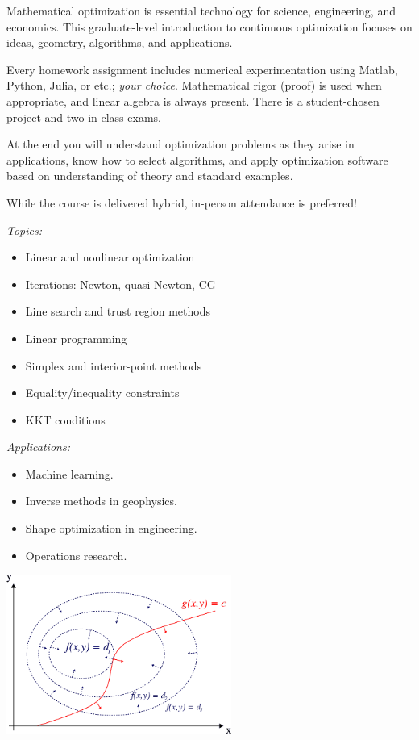 \documentclass[12pt]{amsart}
\begin{document}
Mathematical optimization is essential technology for science, engineering, and economics.  This graduate-level introduction to continuous optimization focuses on ideas, geometry, algorithms, and applications.

\smallskip
Every homework assignment includes numerical experimentation using Matlab, Python, Julia, or etc.; \emph{your choice}.  Mathematical rigor (proof) is used when appropriate, and linear algebra is always present.  There is a student-chosen project and two in-class exams.

\smallskip
At the end you will understand optimization problems as they arise in applications, know how to select algorithms, and apply optimization software based on understanding of theory and standard examples.

\smallskip
While the course is delivered hybrid, in-person attendance is preferred!

\bigskip \noindent 
\begin{minipage}[t]{0.55\textwidth} \emph{Topics:}
\begin{itemize}
\item  Linear and nonlinear optimization
\item  Iterations: Newton, quasi-Newton, CG
\item  Line search and trust region methods
\item  Linear programming
\item  Simplex and interior-point methods
\item  Equality/inequality constraints
\item KKT conditions
\end{itemize}

\bigskip
\emph{Applications:}
\begin{itemize}
\item Machine learning.
\item Inverse methods in geophysics.
\item Shape optimization in engineering.
\item Operations research.
\end{itemize}
\end{minipage}
\begin{minipage}[t]{0.45\textwidth}
\smallskip

\centering
\includegraphics[height=52mm]{../images/lagrange.png}
\end{minipage}
\end{document}

